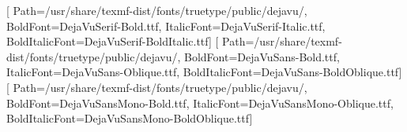 \usepackage{iftex}
\ifPDFTeX
  \usepackage{cmap}
  \usepackage[T2A]{fontenc}
  \usepackage[utf8]{inputenc}
  \usepackage{tempora}
  \usepackage[english,russian]{babel}
\else
  \usepackage{fontspec}
  \setmainfont{DejaVuSerif.ttf}[
    Path=/usr/share/texmf-dist/fonts/truetype/public/dejavu/,
    BoldFont=DejaVuSerif-Bold.ttf,
    ItalicFont=DejaVuSerif-Italic.ttf,
    BoldItalicFont=DejaVuSerif-BoldItalic.ttf]
  \setsansfont{DejaVuSans.ttf}[
    Path=/usr/share/texmf-dist/fonts/truetype/public/dejavu/,
    BoldFont=DejaVuSans-Bold.ttf,
    ItalicFont=DejaVuSans-Oblique.ttf,
    BoldItalicFont=DejaVuSans-BoldOblique.ttf]
  \setmonofont{DejaVuSansMono.ttf}[
    Path=/usr/share/texmf-dist/fonts/truetype/public/dejavu/,
    BoldFont=DejaVuSansMono-Bold.ttf,
    ItalicFont=DejaVuSansMono-Oblique.ttf,
    BoldItalicFont=DejaVuSansMono-BoldOblique.ttf]
  \usepackage{polyglossia}
  \setdefaultlanguage{russian}
\fi

\usepackage{amsmath,amssymb,amsfonts,mathtools,bm}
\usepackage{graphicx}
\usepackage{adjustbox}
\usepackage{tikz}
\usetikzlibrary{positioning,arrows.meta,calc,fit,shapes.geometric,matrix,bending}
\usepackage{etoolbox}
\usepackage{datatool}
\usepackage{siunitx}
\usepackage{booktabs,longtable,tabularx,array,multirow,makecell}
\usepackage{xstring}
\usepackage{xcolor}
\usepackage{indentfirst}
\usepackage{url}
\usepackage{enumitem}
\usepackage{float}
\usepackage{caption}
\usepackage{titlesec}
\usepackage{listings}
\usepackage{microtype}
\usepackage[backend=bibtex,style=numeric,sorting=nyt,maxbibnames=99,autolang=none]{biblatex}


\graphicspath{{img/}}

